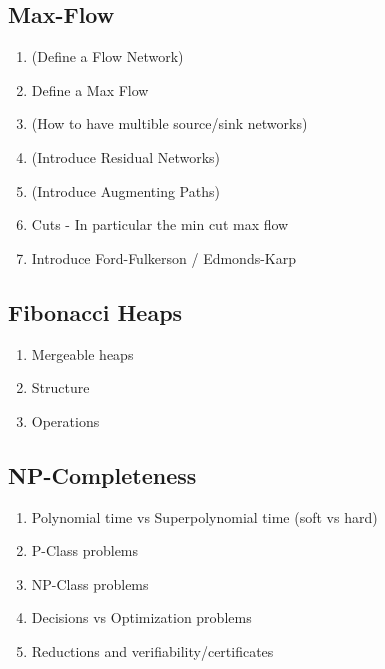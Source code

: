 \subsection{Max-Flow}
\begin{enumerate}
  \item (Define a Flow Network)
  \item Define a Max Flow
  \item (How to have multible source/sink networks)
  \item (Introduce Residual Networks)
  \item (Introduce Augmenting Paths)
  \item Cuts - In particular the min cut max flow
  \item Introduce Ford-Fulkerson / Edmonds-Karp
\end{enumerate}
\newpage

\subsection{Fibonacci Heaps}
\begin{enumerate}
  \item Mergeable heaps
  \item Structure
  \item Operations
\end{enumerate}
\newpage

\subsection{NP-Completeness}
\begin{enumerate}
  \item Polynomial time vs Superpolynomial time (soft vs hard)
  \item P-Class problems
  \item NP-Class problems
  \item Decisions vs Optimization problems
  \item Reductions and verifiability/certificates
\end{enumerate}
\newpage

